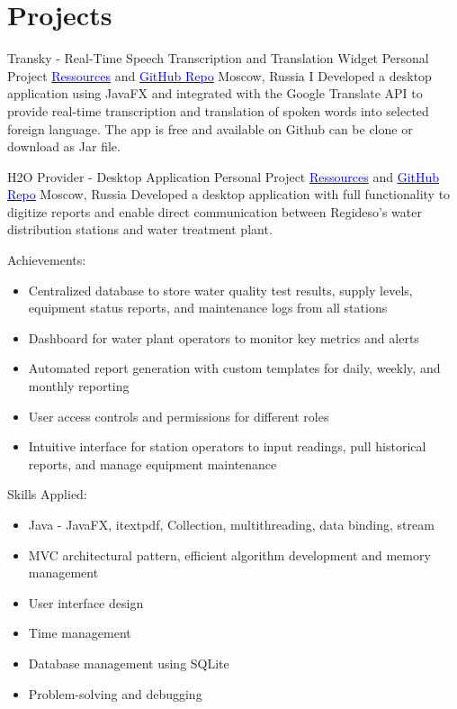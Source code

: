 \section{Projects}

    {Transky - Real-Time Speech Transcription and Translation Widget}
    {Personal Project}
    {\href{https://disk.yandex.ru/d/oncxNLbWMF80EA}{\textcolor{blue}{Ressources}} and 
    \href{https://github.com/DanGlChris/Transky}{\textcolor{blue}{GitHub Repo}} 
     Moscow, Russia
    }
    {
    \newline
    I Developed a desktop application using JavaFX and integrated with the Google Translate API 
    to provide real-time transcription and translation of spoken words into selected foreign language.
    The app is free and available on Github can be clone or download as Jar file.}
    {
    }

\vspace{2mm}

    {H2O Provider - Desktop Application}
    {Personal Project}
    {\href{https://disk.yandex.ru/d/oncxNLbWMF80EA}{\textcolor{blue}{Ressources}} and 
    \href{https://github.com/DanGlChris/H2O-Provider}{\textcolor{blue}{GitHub Repo}} 
    Moscow, Russia
    }
    {
    \newline
    Developed a desktop application with full functionality to digitize reports and enable direct communication
     between Regideso's water distribution stations and water treatment plant.}
    {      
    Achievements:
    \begin{itemize}
        \item Centralized database to store water quality test results, supply levels, equipment status reports, and maintenance logs from all stations
        \item Dashboard for water plant operators to monitor key metrics and alerts
        \item Automated report generation with custom templates for daily, weekly, and monthly reporting
        \item User access controls and permissions for different roles
        \item Intuitive interface for station operators to input readings, pull historical reports, and manage equipment maintenance
    \end{itemize}
    Skills Applied:
    \begin{itemize}
        \item Java - JavaFX, itextpdf, Collection, multithreading, data binding, stream 
        \item MVC architectural pattern, efficient algorithm development and memory management
        \item User interface design
        \item Time management
        \item Database management using SQLite
        \item Problem-solving and debugging
    \end{itemize}
    }

